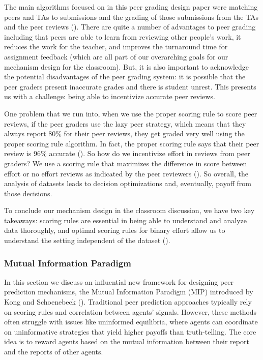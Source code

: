 \documentclass[
  letterpaper,
  numbers=noenddot,
  DIV=11]{scrreprt}
\theoremstyle{definition}
\theoremstyle{plain}
\theoremstyle{plain}
\theoremstyle{remark}
\begin{document}
The main algorithms focused on in this peer grading design paper were
matching peers and TAs to submissions and the grading of those
submissions from the TAs and the peer reviews
(). There are quite a
number of advantages to peer grading including that peers are able to
learn from reviewing other people's work, it reduces the work for the
teacher, and improves the turnaround time for assignment feedback (which
are all part of our overarching goals for our mechanism design for the
classroom). But, it is also important to acknowledge the potential
disadvantages of the peer grading system: it is possible that the peer
graders present inaccurate grades and there is student unrest. This
presents us with a challenge: being able to incentivize accurate peer
reviews.

One problem that we run into, when we use the proper scoring rule to
score peer reviews, if the peer graders use the lazy peer strategy,
which means that they always report 80\(\%\) for their peer reviews,
they get graded very well using the proper scoring rule algorithm. In
fact, the proper scoring rule says that their peer review is 96\(\%\)
accurate (). So how do we
incentivize effort in reviews from peer graders? We use a scoring rule
that maximizes the difference in score between effort or no effort
reviews as indicated by the peer reviewers
(). So overall, the
analysis of datasets leads to decision optimizations and, eventually,
payoff from those decisions.

To conclude our mechanism design in the classroom discussion, we have
two key takeaways: scoring rules are essential in being able to
understand and analyze data thoroughly, and optimal scoring rules for
binary effort allow us to understand the setting independent of the
dataset ().

\subsubsection*{Mutual Information
Paradigm}\label{mutual-information-paradigm}

In this section we discuss an influential new framework for designing
peer prediction mechanisms, the Mutual Information Paradigm (MIP)
introduced by Kong and Schoenebeck
().
Traditional peer prediction approaches typically rely on scoring rules
and correlation between agents' signals. However, these methods often
struggle with issues like uninformed equilibria, where agents can
coordinate on uninformative strategies that yield higher payoffs than
truth-telling. The core idea is to reward agents based on the mutual
information between their report and the reports of other agents.
\end{document}
